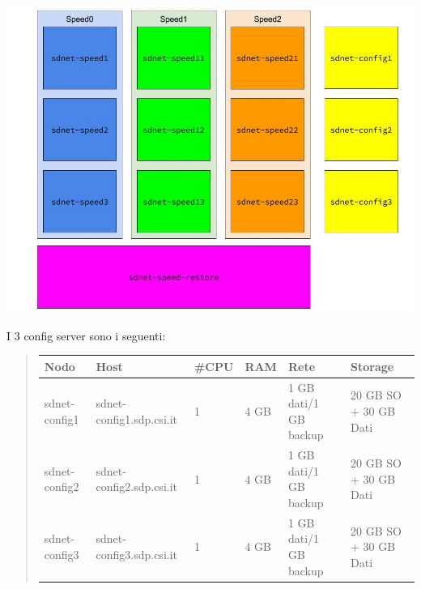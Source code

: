 \documentclass[a4paper,10pt,english]{sphinxmanual}
\begin{document}
\includegraphics{production_cluster_schema.jpg}

I 3 config server sono i seguenti:
\begin{quote}

\begin{tabulary}{\linewidth}{|L|L|L|L|L|L|}
\hline
\textsf{\relax 
\textbf{Nodo}
} & \textsf{\relax 
\textbf{Host}
} & \textsf{\relax 
\textbf{\#CPU}
} & \textsf{\relax 
\textbf{RAM}
} & \textsf{\relax 
\textbf{Rete}
} & \textsf{\relax 
\textbf{Storage}
}\\
\hline
sdnet-config1
 & 
sdnet-config1.sdp.csi.it
 & 
1
 & 
4 GB
 & 
1 GB dati/1 GB backup
 & 
20 GB SO + 30 GB Dati
\\
\hline
sdnet-config2
 & 
sdnet-config2.sdp.csi.it
 & 
1
 & 
4 GB
 & 
1 GB dati/1 GB backup
 & 
20 GB SO + 30 GB Dati
\\
\hline
sdnet-config3
 & 
sdnet-config3.sdp.csi.it
 & 
1
 & 
4 GB
 & 
1 GB dati/1 GB backup
 & 
20 GB SO + 30 GB Dati
\\
\hline\end{tabulary}

\end{quote}
\end{document}
